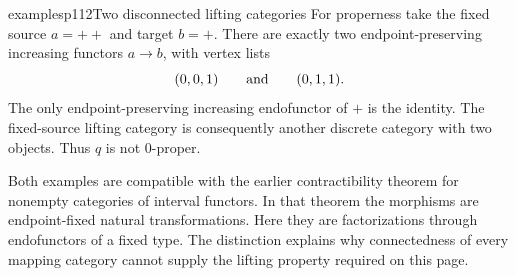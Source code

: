\begin{dcomment}{examples}{p112}{Two disconnected lifting categories}
For properness take the fixed source $a=++$ and target $b=+$.  There are exactly two endpoint-preserving increasing functors $a\to b$, with vertex lists
\[
 (0,0,1)\qquad\hbox{and}\qquad(0,1,1).
\]
The only endpoint-preserving increasing endofunctor of $+$ is the identity.  The fixed-source lifting category is consequently another discrete category with two objects.  Thus $q$ is not $0$-proper.

Both examples are compatible with the earlier contractibility theorem for nonempty categories of interval functors.  In that theorem the morphisms are endpoint-fixed natural transformations.  Here they are factorizations through endofunctors of a fixed type.  The distinction explains why connectedness of every mapping category cannot supply the lifting property required on this page.
\end{dcomment}

